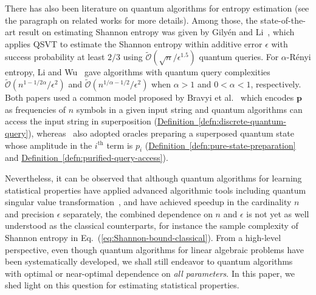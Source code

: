 \documentclass[journal]{IEEEtran}
\newcommand{\eq}[1]{Eq.~(\ref{eq:#1})}
\newcommand{\defn}[1]{\hyperref[defn:#1]{Definition~\ref*{defn:#1}}}
\begin{document}
There has also been literature on quantum algorithms for entropy estimation (see the paragraph on related works for more details). Among those, the state-of-the-art result on estimating Shannon entropy was given by Gily{\'e}n and Li~\cite{gilyen2019distributional}, which applies QSVT to estimate the Shannon entropy within additive error $\epsilon$ with success probability at least $2/3$ using $\widetilde{\mathcal{O}}(\sqrt{n}/\epsilon^{1.5})$ quantum queries. For $\alpha$-R{\'e}nyi entropy, Li and Wu~\cite{li2019entropy} gave algorithms with quantum query complexities $\widetilde{\mathcal{O}}(n^{1-1/2\alpha}/\epsilon^{2})$ and $\widetilde{\mathcal{O}}(n^{1/\alpha-1/2}/\epsilon^{2})$ when $\alpha>1$ and $0<\alpha<1$, respectively. Both papers used a common model proposed by Bravyi et al.~\cite{bravyi2011quantum} which encodes $\mathbf{p}$ as frequencies of $n$ symbols in a given input string and quantum algorithms can access the input string in superposition (\defn{discrete-quantum-query}), whereas~\cite{gilyen2019distributional} also adopted oracles preparing a superposed quantum state whose amplitude in the $i^{\text{th}}$ term is $p_{i}$ (\defn{pure-state-preparation} and \defn{purified-query-access}).

Nevertheless, it can be observed that although quantum algorithms for learning statistical properties have applied advanced algorithmic tools including quantum singular value transformation~\cite{gilyen2019singular}, and have achieved speedup in the cardinality $n$ and precision $\epsilon$ separately, the combined dependence on $n$ and $\epsilon$ is not yet as well understood as the classical counterparts, for instance the sample complexity of Shannon entropy in \eq{Shannon-bound-classical}. From a high-level perspective, even though quantum algorithms for linear algebraic problems have been systematically developed, we shall still endeavor to quantum algorithms with optimal or near-optimal dependence on \emph{all parameters}. In this paper, we shed light on this question for estimating statistical properties.

\end{document}
